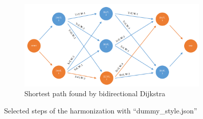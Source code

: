 \begin{figure}
\begin{subfigure}[b]{0.70\textwidth}
   \includegraphics[width=\linewidth]{Chapters/pic/44}
   \caption{Shortest path found by bidirectional Dijkstra}
   \label{fig:44}
\end{subfigure}

\caption{Selected steps of the harmonization with ``dummy\_style.json''}
\end{figure}

